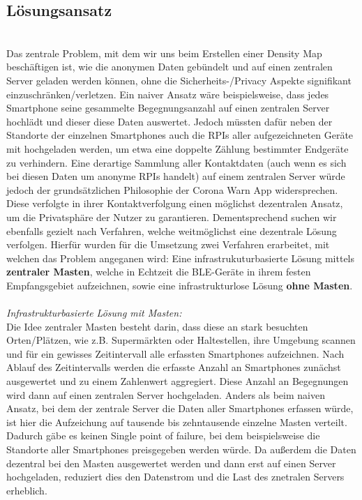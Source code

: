 \documentclass[conference,compsoc]{IEEEtran}
\begin{document}
\subsection{Lösungsansatz} \label{Lösungsansatz}
\text{ }\\
Das zentrale Problem, mit dem wir uns beim Erstellen einer Density Map beschäftigen ist, wie die anonymen Daten gebündelt und auf einen zentralen Server geladen werden können, ohne die Sicherheits-/Privacy Aspekte signifikant einzuschränken/verletzen. 
Ein naiver Ansatz wäre beispielsweise, dass jedes Smartphone seine gesammelte Begegnungsanzahl auf einen zentralen Server hochlädt und dieser diese Daten auswertet. 
Jedoch müssten dafür neben der Standorte der einzelnen Smartphones auch die RPIs aller aufgezeichneten Geräte mit hochgeladen werden, um etwa eine doppelte Zählung bestimmter Endgeräte zu verhindern. 
Eine derartige Sammlung aller Kontaktdaten (auch wenn es sich bei diesen Daten um anonyme RPIs handelt) auf einem zentralen Server würde jedoch der grundsätzlichen Philosophie der Corona Warn App widersprechen.
Diese verfolgte in ihrer Kontaktverfolgung einen möglichst dezentralen Ansatz, um die Privatsphäre der Nutzer zu garantieren.
Dementsprechend suchen wir ebenfalls gezielt nach Verfahren, welche weitmöglichst eine dezentrale Lösung verfolgen. 
Hierfür wurden für die Umsetzung zwei Verfahren erarbeitet, mit welchen das Problem angeganen wird: Eine infrastrukuturbasierte Lösung mittels \textbf{zentraler Masten}, welche in Echtzeit die BLE-Geräte in ihrem festen Empfangsgebiet aufzeichnen, sowie eine infrastrukturlose Lösung \textbf{ohne Masten}. \\ \\
\textit{Infrastrukturbasierte Lösung mit Masten: }\\
Die Idee zentraler Masten besteht darin, dass diese an stark besuchten Orten/Plätzen, wie z.B. Supermärkten oder Haltestellen, ihre Umgebung scannen und für ein gewisses Zeitintervall alle erfassten Smartphones aufzeichnen. 
Nach Ablauf des Zeitintervalls werden die erfasste Anzahl an Smartphones zunächst ausgewertet und zu einem Zahlenwert aggregiert.
Diese Anzahl an Begegnungen wird dann auf einen zentralen Server hochgeladen.
Anders als beim naiven Ansatz, bei dem der zentrale Server die Daten aller Smartphones erfassen würde, ist hier die Aufzeichung auf tausende bis zehntausende einzelne Masten verteilt. 
Dadurch gäbe es keinen \glqq Single point of failure\grqq, bei dem beispielsweise die Standorte aller Smartphones preisgegeben werden würde. 
Da außerdem die Daten dezentral bei den Masten ausgewertet werden und dann erst auf einen Server hochgeladen, reduziert dies den Datenstrom und die Last des znetralen Servers erheblich. 
\end{document}
